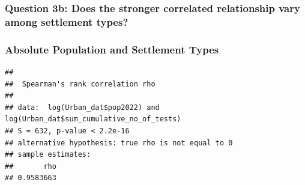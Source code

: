 \documentclass[
  12pt,
]{article}
\newenvironment{Shaded}{\begin{snugshade}}{\end{snugshade}}
\newcommand{\AttributeTok}[1]{\textcolor[rgb]{0.77,0.63,0.00}{#1}}
\newcommand{\DocumentationTok}[1]{\textcolor[rgb]{0.56,0.35,0.01}{\textbf{\textit{#1}}}}
\newcommand{\FunctionTok}[1]{\textcolor[rgb]{0.00,0.00,0.00}{#1}}
\newcommand{\NormalTok}[1]{#1}
\newcommand{\OtherTok}[1]{\textcolor[rgb]{0.56,0.35,0.01}{#1}}
\newcommand{\SpecialCharTok}[1]{\textcolor[rgb]{0.00,0.00,0.00}{#1}}
\newcommand{\StringTok}[1]{\textcolor[rgb]{0.31,0.60,0.02}{#1}}
\begin{document}
\hypertarget{question-3b-does-the-stronger-correlated-relationship-vary-among-settlement-types}{%
\subsubsection{Question 3b: Does the stronger correlated relationship
vary among settlement
types?}\label{question-3b-does-the-stronger-correlated-relationship-vary-among-settlement-types}}

\hypertarget{absolute-population-and-settlement-types}{%
\subsubsection{Absolute Population and Settlement
Types}\label{absolute-population-and-settlement-types}}

\begin{Shaded}
\end{Shaded}

\begin{verbatim}
## 
##  Spearman's rank correlation rho
## 
## data:  log(Urban_dat$pop2022) and log(Urban_dat$sum_cumulative_no_of_tests)
## S = 632, p-value < 2.2e-16
## alternative hypothesis: true rho is not equal to 0
## sample estimates:
##       rho 
## 0.9583663
\end{verbatim}
\end{document}
